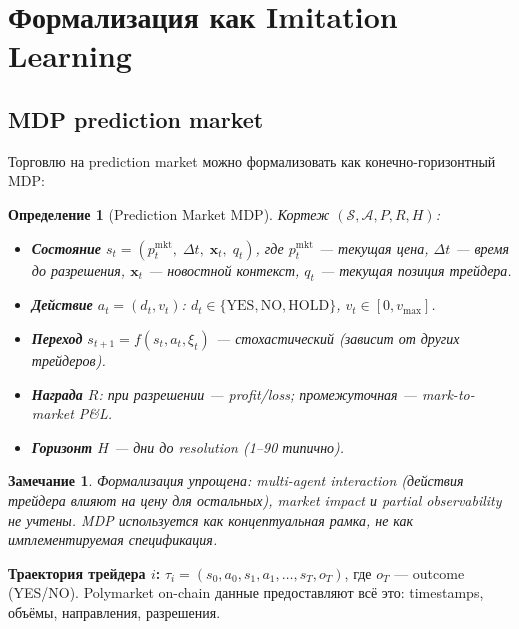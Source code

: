 \documentclass[a4paper, 11pt]{article}
\newtheorem{definition}{Определение}[section]
\newtheorem{remark}{Замечание}[section]
\begin{document}
\section{Формализация как Imitation Learning}
\label{sec:il}

\subsection{MDP prediction market}

Торговлю на prediction market можно формализовать как конечно-горизонтный MDP:

\begin{definition}[Prediction Market MDP]
\label{def:mdp}
Кортеж $(\mathcal{S}, \mathcal{A}, P, R, H)$:
\begin{itemize}[nosep]
  \item \textbf{Состояние} $s_t = (p_t^{\mathrm{mkt}},\; \Delta t,\; \mathbf{x}_t,\; q_t)$,
    где $p_t^{\mathrm{mkt}}$ --- текущая цена, $\Delta t$ --- время до разрешения,
    $\mathbf{x}_t$ --- новостной контекст, $q_t$ --- текущая позиция трейдера.
  \item \textbf{Действие} $a_t = (d_t, v_t)$:
    $d_t \in \{\text{YES}, \text{NO}, \text{HOLD}\}$, $v_t \in [0, v_{\max}]$.
  \item \textbf{Переход} $s_{t+1} = f(s_t, a_t, \xi_t)$ --- стохастический (зависит от других трейдеров).
  \item \textbf{Награда} $R$: при разрешении --- profit/loss; промежуточная --- mark-to-market P\&L.
  \item \textbf{Горизонт} $H$ --- дни до resolution (1--90 типично).
\end{itemize}
\end{definition}

\begin{remark}
Формализация упрощена: multi-agent interaction (действия трейдера
влияют на цену для остальных), market impact и partial observability не учтены.
MDP используется как концептуальная рамка, не как имплементируемая спецификация.
\end{remark}

\textbf{Траектория трейдера $i$:}
$\tau_i = (s_0, a_0, s_1, a_1, \ldots, s_T, o_T)$, где $o_T$ --- outcome (YES/NO).
Polymarket on-chain данные предоставляют всё это: timestamps, объёмы, направления, разрешения.
\end{document}
